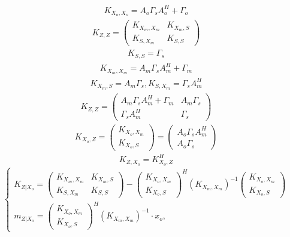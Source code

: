\documentclass[11pt]{article}
\begin{document}
\begin{gather}
K_{X_o,X_o}=A_o\Gamma_sA_o^H+\Gamma_o
\end{gather}
\begin{gather}
K_{Z,Z} = \begin{pmatrix}
K_{X_m, X_m}&K_{X_m, S}\\
K_{S, X_m}&K_{S, S}
\end{pmatrix}
\end{gather}
\begin{gather}
K_{S,S} = \Gamma_s
\end{gather}
\begin{gather}
K_{X_m,X_m} = A_m \Gamma_s A_m^H + \Gamma_m
\end{gather}
\begin{gather}
K_{X_m,S} = A_m \Gamma_s, K_{S, X_m} = \Gamma_s A_m^H 
\end{gather}
\begin{gather}
K_{Z,Z} = \begin{pmatrix}
A_m \Gamma_s A_m^H + \Gamma_m&A_m \Gamma_s\\
\Gamma_s A_m^H&\Gamma_s
\end{pmatrix}
\end{gather}
\begin{gather}
K_{X_o,Z}
= \begin{pmatrix}
K_{X_o,X_m}\\
K_{X_o,S}
\end{pmatrix}= 
\begin{pmatrix}
A_o\Gamma_s A_m^H\\
A_o\Gamma_s
\end{pmatrix}
\end{gather}
\begin{gather}
K_{Z,X_o}
= K_{X_o,Z}^H
\end{gather}
\begin{equation}
\left\{ \begin{gathered} 
K_{Z|X_o} = \begin{pmatrix}
K_{X_m, X_m}&K_{X_m, S}\\
K_{S, X_m}&K_{S, S}
\end{pmatrix}-\begin{pmatrix}
K_{X_o,X_m}\\
K_{X_o,S}
\end{pmatrix}^H(K_{X_m,X_m})^{-1}\begin{pmatrix}
K_{X_o,X_m}\\
K_{X_o,S}
\end{pmatrix} \\
m_{Z|X_o} =   \begin{pmatrix}
K_{X_o,X_m}\\
K_{X_o,S}
\end{pmatrix}^H(K_{X_m,X_m})^{-1}\cdot x_o,
\end{gathered} \right.
\end{equation}
\end{document}
